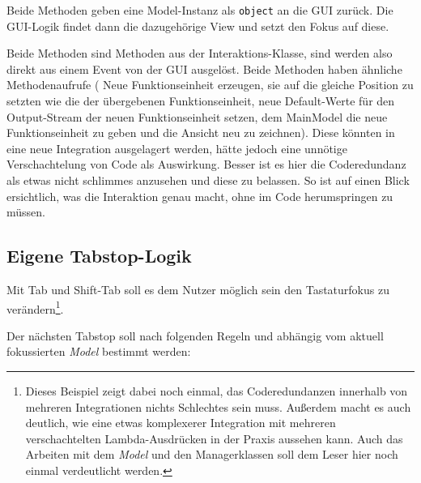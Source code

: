 	Beide Methoden geben eine
	Model-Instanz als \texttt{object} an die GUI zurück. Die GUI-Logik findet dann die
	dazugehörige View und setzt den Fokus auf diese.
	
	Beide Methoden sind Methoden aus der Interaktions-Klasse, sind werden also
	direkt aus einem Event von der GUI ausgelöst. 
	Beide Methoden haben ähnliche Methodenaufrufe ( Neue Funktionseinheit
	erzeugen, sie auf die gleiche Position zu setzten wie die der übergebenen
	Funktionseinheit, neue Default-Werte für den Output-Stream der neuen
	Funktionseinheit setzen, dem MainModel die neue Funktionseinheit zu geben
	und die Ansicht neu zu zeichnen). Diese könnten in eine neue
	Integration ausgelagert werden, hätte jedoch eine unnötige
	Verschachtelung von Code als Auswirkung. Besser ist es hier die
	Coderedundanz als etwas nicht schlimmes anzusehen und diese zu belassen.
	So ist auf einen Blick ersichtlich, was die Interaktion genau macht, ohne
	im Code herumspringen zu müssen.

\subsection{Eigene Tabstop-Logik}

Mit Tab und Shift-Tab soll es dem Nutzer möglich sein den Tastaturfokus zu
verändern\footnote{Dieses Beispiel zeigt dabei noch einmal, das Coderedundanzen innerhalb
von mehreren Integrationen nichts Schlechtes sein muss.
Außerdem macht es auch deutlich, wie eine etwas komplexerer Integration mit
mehreren verschachtelten Lambda-Ausdrücken in der Praxis aussehen kann. Auch das Arbeiten mit dem \textit{Model} und den Managerklassen soll dem Leser hier noch einmal verdeutlicht werden.}.



Der nächsten Tabstop soll nach folgenden Regeln und abhängig vom aktuell
fokussierten \textit{Model} bestimmt werden:

